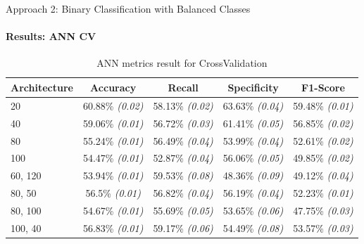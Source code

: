 \documentclass[9pt, pstricks, xcolor=dvipsnames]{beamer}
\begin{document}
\begin{frame}{Approach 2: Binary Classification
with Balanced Classes}
\framesubtitle{Results: ANN CV}
\begin{table}[h]
    \centering
    \begin{tabular}{lcccc}
        \toprule
        Architecture & Accuracy & Recall & Specificity & F1-Score \\
        \midrule
        20 & 60.88\% \textit{(0.02)} & 58.13\% \textit{(0.02)} & 63.63\% \textit{(0.04)} & 59.48\% \textit{(0.01)} \\
        40 & 59.06\% \textit{(0.01)} & 56.72\% \textit{(0.03)} & 61.41\% \textit{(0.05)} & 56.85\% \textit{(0.02)} \\
        80 & 55.24\% \textit{(0.01)} & 56.49\% \textit{(0.04)} & 53.99\% \textit{(0.04)} & 52.61\% \textit{(0.02)} \\
        100 & 54.47\% \textit{(0.01)} & 52.87\% \textit{(0.04)} & 56.06\% \textit{(0.05)} & 49.85\% \textit{(0.02)} \\
        60, 120 & 53.94\% \textit{(0.01)} & 59.53\% \textit{(0.08)} & 48.36\% \textit{(0.09)} & 49.12\% \textit{(0.04)} \\
        80, 50 & 56.5\% \textit{(0.01)} & 56.82\% \textit{(0.04)} & 56.19\% \textit{(0.04)} & 52.23\% \textit{(0.01)} \\
        80, 100 & 54.67\% \textit{(0.01)} & 55.69\% \textit{(0.05)} & 53.65\% \textit{(0.06)} & 47.75\% \textit{(0.03)} \\
        100, 40 & 56.83\% \textit{(0.01)} & 59.17\% \textit{(0.06)} & 54.49\% \textit{(0.08)} & 53.57\% \textit{(0.03)} \\
        \bottomrule
    \end{tabular}
    \caption{ANN metrics result for CrossValidation}
    \label{tab:ann_CV_approach2}
\end{table}
\end{frame}
\end{document}
